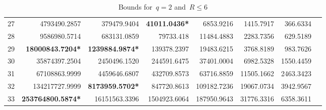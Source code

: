 \documentclass[10pt,a4paper]{article}
\theoremstyle{definition}
\begin{document}
\begin{table}[H]
{\begin{tabular}{r| r*{6}{r}}
27 & 4793490.2857  & 379479.9404& \textbf{41011.0436*}& 6853.9216& 1415.7917 & 366.6334 \\
28 & 9586980.5714 & 683131.0859 & 79733.418&11484.4883 & 2283.7356& 629.5189\\
29 & \textbf{18000843.7204*} & \textbf{1239884.9874*}& 139378.2397 &19483.6215 & 3768.8189 & 983.7626\\
30 & {35874397.2504} & 2450496.1520& 244591.6475 & 37401.0004 & 6982.5328 &  1550.4459\\
31 & 67108863.9999 & 4459646.6807& 432709.8573  & 63716.8859 & 11505.1662 & 2463.3423\\
32 &  134217727.9999 & \textbf{8173959.5702*}& 847720.8613& 109182.7236& 19067.0734 & 3942.9567\\
33 &  \textbf{253764800.5874*}& 16151563.3396&  1504923.6064& 187950.9643 & 31776.3316 & 6358.3611\\
\hline
\end{tabular}  }
\caption{\label{table:binarysmallr}Bounds for~$q=2$ and~$R \leq 6$ }
\end{table}

\begin{table}[H]
\caption{\label{table:binarylarger}Bounds for~$q=2$ and~$R\geq 7$ }
\end{table}
\end{document}
